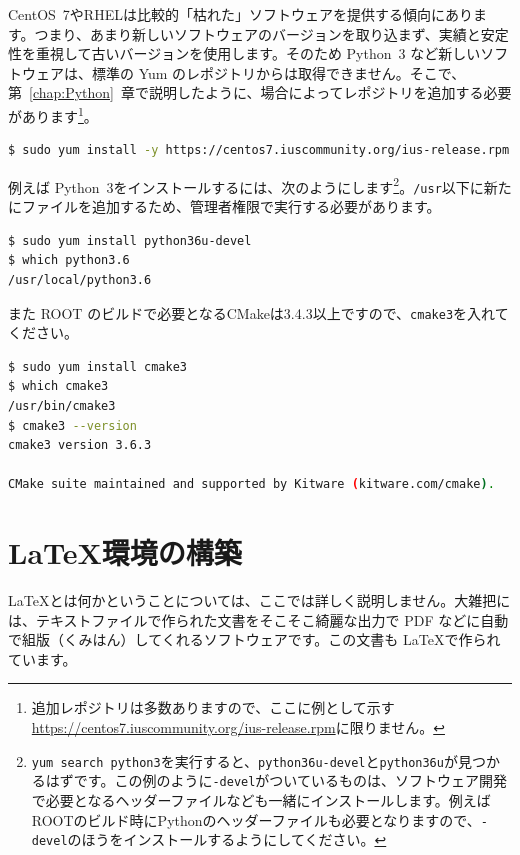 CentOS~7やRHELは比較的「枯れた」ソフトウェアを提供する傾向にあります。つまり、あまり新しいソフトウェアのバージョンを取り込まず、実績と安定性を重視して古いバージョンを使用します。そのため Python~3 など新しいソフトウェアは、標準の Yum のレポジトリからは取得できません。そこで、第~\ref{chap:Python}~章で説明したように、場合によってレポジトリを追加する必要があります\footnote{追加レポジトリは多数ありますので、ここに例として示す\url{https://centos7.iuscommunity.org/ius-release.rpm}に限りません。}。

\begin{lstlisting}[language=bash]
$ sudo yum install -y https://centos7.iuscommunity.org/ius-release.rpm
\end{lstlisting}

例えば Python~3をインストールするには、次のようにします\footnote{\texttt{yum search python3}を実行すると、\texttt{python36u-devel}と\texttt{python36u}が見つかるはずです。この例のように\texttt{-devel}がついているものは、ソフトウェア開発で必要となるヘッダーファイルなども一緒にインストールします。例えばROOTのビルド時にPythonのヘッダーファイルも必要となりますので、\texttt{-devel}のほうをインストールするようにしてください。}。\texttt{/usr}以下に新たにファイルを追加するため、管理者権限で実行する必要があります。

\begin{lstlisting}[language=bash]
$ sudo yum install python36u-devel
$ which python3.6
/usr/local/python3.6
\end{lstlisting}

また ROOT のビルドで必要となるCMakeは3.4.3以上ですので、\texttt{cmake3}を入れてください。

\begin{lstlisting}[language=bash]
$ sudo yum install cmake3
$ which cmake3
/usr/bin/cmake3
$ cmake3 --version
cmake3 version 3.6.3

CMake suite maintained and supported by Kitware (kitware.com/cmake).
\end{lstlisting}

\chapter{\LaTeX 環境の構築}
\label{chap:LaTeX}

\LaTeX とは何かということについては、ここでは詳しく説明しません。大雑把には、テキストファイルで作られた文書をそこそこ綺麗な出力で PDF などに自動で組版（くみはん）してくれるソフトウェアです。この文書も \LaTeX で作られています。

